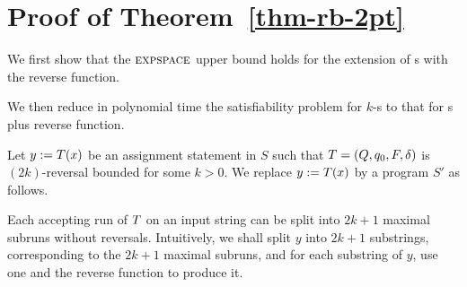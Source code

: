 
\section{Proof of Theorem~\ref{thm-rb-2pt}}\label{app-rb-2pt}

We first show that the $\textsc{expspace}$ upper bound holds for the extension of \PT{}s with the reverse function. 

We then reduce in polynomial time the satisfiability problem for $k$-\RBPPT{}s to that for \PT{}s plus reverse function.

Let $y := T(x)$ be an assignment statement in $S$ such that $T = (Q, q_0, F, \delta)$ is $(2k)$-reversal bounded for some $k > 0$. We replace $y := T(x)$ by a program $S'$ as follows.

Each accepting run of $T$ on an input string can be split into $2k+1$ maximal subruns without reversals.
Intuitively, we shall split $y$ into $2k+1$ substrings, corresponding to the $2k+1$ maximal subruns, and for each substring of $y$, use one \PT{} and the reverse function to produce it.

\newcommand\prefix{\mathsf{prefix}}
\newcommand\suffix{\mathsf{suffix}}
\newcommand\finalpass{\mathsf{finalpass}}
\newcommand\reverse{\mathsf{reverse}}
\newcommand\concatpt{\mathsf{concat}}

